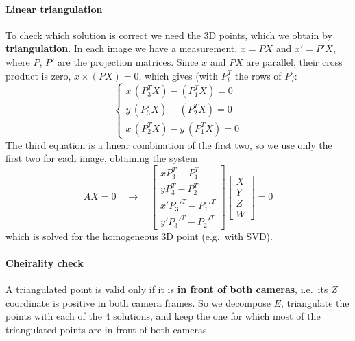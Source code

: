 \paragraph{Linear triangulation}
To check which solution is correct we need the 3D points, which we obtain by \textbf{triangulation}.
In each image we have a measurement, $x = PX$ and $x' = P'X$, where $P$, $P'$ are the projection matrices.
Since $x$ and $PX$ are parallel, their cross product is zero, $x \times (PX) = 0$, which gives (with $P_i^T$ the rows of $P$):
\[
\begin{cases}
x\,(P_3^T X) - (P_1^T X) = 0 \\
y\,(P_3^T X) - (P_2^T X) = 0 \\
x\,(P_2^T X) - y\,(P_1^T X) = 0
\end{cases}
\]
The third equation is a linear combination of the first two, so we use only the first two for each image, obtaining the system
\[
A X = 0 \quad\rightarrow\quad
\begin{bmatrix} x P_3^T - P_1^T \\ y P_3^T - P_2^T \\ x' P_3'^T - P_1'^T \\ y' P_3'^T - P_2'^T \end{bmatrix}
\begin{bmatrix} X \\ Y \\ Z \\ W \end{bmatrix} = 0
\]
which is solved for the homogeneous 3D point (e.g.\ with SVD).

\paragraph{Cheirality check}
A triangulated point is valid only if it is \textbf{in front of both cameras}, i.e.\ its $Z$ coordinate is positive in both camera frames.
So we decompose $E$, triangulate the points with each of the 4 solutions, and keep the one for which most of the triangulated points are in front of both cameras.

